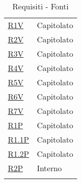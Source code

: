 \begin{center}
\begin{longtable}[!h]{p{50px} p{50px}}
        \hyperref[tab:RequisitiVincolo]{R1V}         & Capitolato                    \\
        \hyperref[tab:RequisitiVincolo]{R2V}         & Capitolato                    \\
        \hyperref[tab:RequisitiVincolo]{R3V}         & Capitolato                    \\
        \hyperref[tab:RequisitiVincolo]{R4V}         & Capitolato                    \\
        \hyperref[tab:RequisitiVincolo]{R5V}         & Capitolato                    \\
        \hyperref[tab:RequisitiVincolo]{R6V}         & Capitolato                    \\
        \hyperref[tab:RequisitiVincolo]{R7V}         & Capitolato                    \\

        \hyperref[tab:RequisitiPrestazionali]{R1P}   & Capitolato                    \\
        \hyperref[tab:RequisitiPrestazionali]{R1.1P} & Capitolato                    \\
        \hyperref[tab:RequisitiPrestazionali]{R1.2P} & Capitolato                    \\
        \hyperref[tab:RequisitiPrestazionali]{R2P}   & Interno                       \\

        \rowcolor{white}\caption{Requisiti - Fonti}
    \end{longtable}
\end{center}